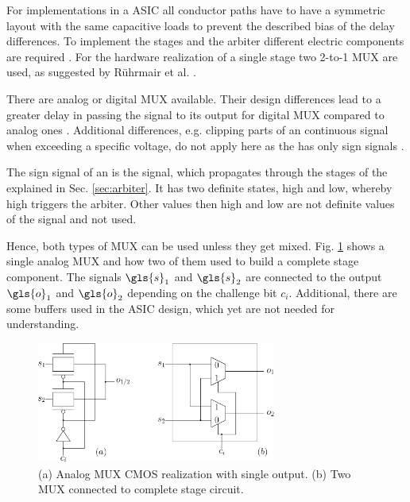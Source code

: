 For \apuf implementations in a \ac{ASIC} all conductor paths have to have a symmetric layout with the same capacitive loads to prevent the described bias of the delay differences.
To implement the stages and the arbiter different electric components are required \cite{Maes2012ExperimentalCMOS}. %
For the hardware realization of a single stage two 2-to-1 \ac{MUX} are used, as suggested by Rührmair et al. \cite{Ruhrmair2013PUFData, Lee2004AApplications}.%

There are analog or digital \ac{MUX} available. %
Their design differences lead to a greater delay in passing the signal to its output for digital \ac{MUX} compared to analog ones \cite{Wikipedia2016Multiplexer}.
Additional differences, e.g. clipping parts of an continuous signal when exceeding a specific voltage, do not apply here as the \apuf has only sign signals \cite{Semiconductor2002BasicComparison}. %

The sign signal of an \apuf is the signal, which propagates through the stages of the \apuf explained in Sec. \ref{sec:arbiter}.
It has two definite states, high and low, whereby high triggers the arbiter.
Other values then high and low are not definite values of the signal and not used.

Hence, both types of \ac{MUX} can be used unless they get mixed.
Fig. \ref{fig:multiplexer} shows a single analog \ac{MUX} and how two of them used to build a complete stage component. %
The signals $\gls{s}_1$ and $\gls{s}_2$ are connected to the output $\gls{o}_1$ and $\gls{o}_2$ depending on the challenge bit $c_i$.
Additional, there are some buffers used in the \ac{ASIC} design, which yet are not needed for understanding.

\begin{figure}[ht]
\centering
\includegraphics[width=0.70\textwidth]{images/stage_circuit.eps}
\caption[Analog \acs{MUX} and stage circuit]{(a) Analog \ac{MUX} \ac{CMOS} realization with single output.
(b) Two \acs{MUX} connected to complete stage circuit.}
\label{fig:multiplexer}
\end{figure}

